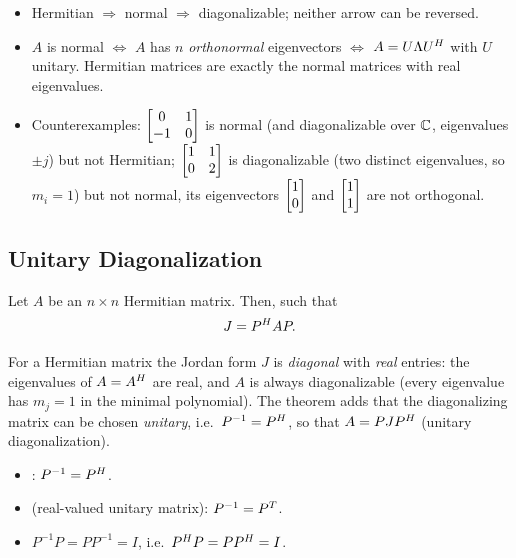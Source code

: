 \begin{insight}
\begin{itemize}[nosep]
\item Hermitian $\Rightarrow$ normal $\Rightarrow$ diagonalizable; neither arrow can be reversed.
\item $A$ is normal $\iff$ $A$ has $n$ \emph{orthonormal} eigenvectors $\iff$ $A=U\Lambda U^{H}$ with $U$ unitary. Hermitian matrices are exactly the normal matrices with real eigenvalues.
\item Counterexamples: $\begin{bmatrix}0&1\\-1&0\end{bmatrix}$ is normal (and diagonalizable over $\mathbb{C}$, eigenvalues $\pm j$) but not Hermitian; $\begin{bmatrix}1&1\\0&2\end{bmatrix}$ is diagonalizable (two distinct eigenvalues, so $m_i=1$) but not normal, its eigenvectors $\begin{bmatrix}1\\0\end{bmatrix}$ and $\begin{bmatrix}1\\1\end{bmatrix}$ are not orthogonal.
\end{itemize}
\end{insight}

\subsection{Unitary Diagonalization}\label{ss:unitary}
%
\begin{theorem}
Let $A$ be an $n\times n$ Hermitian matrix. Then,  such that
\[
J = P^{H} A P .
\]
\end{theorem}
\begin{insight}
For a Hermitian matrix the Jordan form $J$ is \emph{diagonal} with \emph{real} entries: the eigenvalues of $A=A^{H}$ are real, and $A$ is always diagonalizable (every eigenvalue has $m_j=1$ in the minimal polynomial). The theorem adds that the diagonalizing matrix can be chosen \emph{unitary}, i.e.\ $P^{-1}=P^{H}$, so that $A = PJP^{H}$ (unitary diagonalization).
\end{insight}
\begin{itemize}
\item {}: $P^{-1} = P^{H}$.
\item {} (real-valued unitary matrix): $P^{-1} = P^{T}$.
\item $P^{-1}P = PP^{-1} = I$, \quad i.e.\ \quad $P^{H} P = PP^{H} = I$.
\end{itemize}

